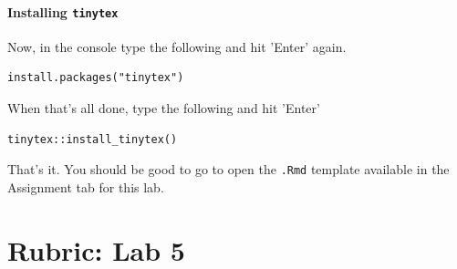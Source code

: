 \documentclass[
]{book}
\begin{document}
\hypertarget{installing-tinytex}{%
\subsubsection*{\texorpdfstring{Installing \texttt{tinytex}}{Installing tinytex}}\label{installing-tinytex}}

Now, in the console type the following and hit 'Enter' again.

\begin{verbatim}
install.packages("tinytex")
\end{verbatim}

When that's all done, type the following and hit 'Enter'

\begin{verbatim}
tinytex::install_tinytex()
\end{verbatim}

That's it. You should be good to go to open the \texttt{.Rmd} template available in the Assignment tab for this lab.

\hypertarget{rubric-lab-5}{%
\chapter*{Rubric: Lab 5}\label{rubric-lab-5}}
\end{document}
